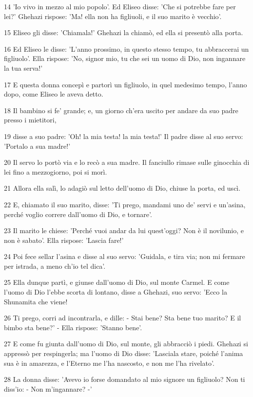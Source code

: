 \par 14 'Io vivo in mezzo al mio popolo'. Ed Eliseo disse: 'Che si potrebbe fare per lei?' Ghehazi rispose: 'Ma! ella non ha figliuoli, e il suo marito è vecchio'.
\par 15 Eliseo gli disse: 'Chiamala!' Ghehazi la chiamò, ed ella si presentò alla porta.
\par 16 Ed Eliseo le disse: 'L'anno prossimo, in questo stesso tempo, tu abbraccerai un figliuolo'. Ella rispose: 'No, signor mio, tu che sei un uomo di Dio, non ingannare la tua serva!'
\par 17 E questa donna concepì e partorì un figliuolo, in quel medesimo tempo, l'anno dopo, come Eliseo le aveva detto.
\par 18 Il bambino si fe' grande; e, un giorno ch'era uscito per andare da suo padre presso i mietitori,
\par 19 disse a suo padre: 'Oh! la mia testa! la mia testa!' Il padre disse al suo servo: 'Portalo a sua madre!'
\par 20 Il servo lo portò via e lo recò a sua madre. Il fanciullo rimase sulle ginocchia di lei fino a mezzogiorno, poi si morì.
\par 21 Allora ella salì, lo adagiò sul letto dell'uomo di Dio, chiuse la porta, ed uscì.
\par 22 E, chiamato il suo marito, disse: 'Ti prego, mandami uno de' servi e un'asina, perché voglio correre dall'uomo di Dio, e tornare'.
\par 23 Il marito le chiese: 'Perché vuoi andar da lui quest'oggi? Non è il novilunio, e non è sabato'. Ella rispose: 'Lascia fare!'
\par 24 Poi fece sellar l'asina e disse al suo servo: 'Guidala, e tira via; non mi fermare per istrada, a meno ch'io tel dica'.
\par 25 Ella dunque partì, e giunse dall'uomo di Dio, sul monte Carmel. E come l'uomo di Dio l'ebbe scorta di lontano, disse a Ghehazi, suo servo: 'Ecco la Shunamita che viene!
\par 26 Ti prego, corri ad incontrarla, e dille: - Stai bene? Sta bene tuo marito? E il bimbo sta bene?' - Ella rispose: 'Stanno bene'.
\par 27 E come fu giunta dall'uomo di Dio, sul monte, gli abbracciò i piedi. Ghehazi si appressò per respingerla; ma l'uomo di Dio disse: 'Lasciala stare, poiché l'anima sua è in amarezza, e l'Eterno me l'ha nascosto, e non me l'ha rivelato'.
\par 28 La donna disse: 'Avevo io forse domandato al mio signore un figliuolo? Non ti diss'io: - Non m'ingannare? -'
